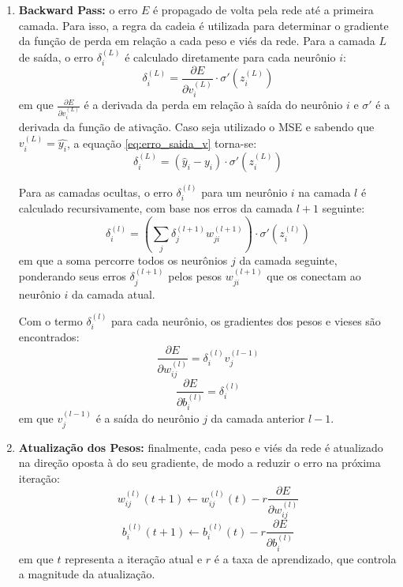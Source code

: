 \begin{enumerate}
\item \textbf{Backward Pass:} o erro $ E $ é propagado de volta pela rede até a primeira camada. Para isso, a regra da cadeia 
é utilizada para determinar o gradiente da função de perda em relação a cada peso e viés da rede. Para a camada $ L $ de saída, 
o erro $ \delta_i^{(L)} $ é calculado diretamente para cada neurônio $ i $:
\begin{equation}
\label{eq:erro_saida_v}
\delta_i^{(L)} = \frac{\partial E}{\partial v_i^{(L)}} \cdot \sigma'(z_i^{(L)})
\end{equation}
em que $\frac{\partial E}{\partial v_i^{(L)}}$ é a derivada da perda em relação à saída do neurônio $i$ e $\sigma'$ é a 
derivada da função de ativação. Caso seja utilizado o MSE e sabendo que $ v_i^{(L)} = \hat{y_i} $, a equação 
\ref{eq:erro_saida_v} torna-se:
\begin{equation}
\label{eq:erro_saida_mse_v}
\delta_i^{(L)} = (\hat{y}_i - y_i) \cdot \sigma'(z_i^{(L)})
\end{equation}

Para as camadas ocultas, o erro $ \delta_i^{(l)} $ para um neurônio $ i $ na camada $ l $ é calculado recursivamente, 
com base nos erros da camada $ l+1 $ seguinte:
\begin{equation}
\label{eq:erro_oculta_v}
\delta_i^{(l)} = \left( \sum_{j} \delta_j^{(l+1)} w_{ji}^{(l+1)} \right) \cdot \sigma'(z_i^{(l)})
\end{equation}
em que a soma percorre todos os neurônios $j$ da camada seguinte, ponderando seus erros $\delta_j^{(l+1)}$ pelos 
pesos $w_{ji}^{(l+1)}$ que os conectam ao neurônio $i$ da camada atual.

Com o termo $\delta_i^{(l)}$ para cada neurônio, os gradientes dos pesos e vieses são encontrados:
\begin{equation}
\label{eq:gradiente_pesos_v}
\frac{\partial E}{\partial w_{ij}^{(l)}} = \delta_i^{(l)} v_j^{(l-1)}
\end{equation}
\begin{equation}
\label{eq:gradiente_bias_v}
\frac{\partial E}{\partial b_i^{(l)}} = \delta_i^{(l)}
\end{equation}
em que $v_j^{(l-1)}$ é a saída do neurônio $j$ da camada anterior $l-1$.

\item \textbf{Atualização dos Pesos:} finalmente, cada peso e viés da rede é atualizado na direção oposta à do seu gradiente, 
de modo a reduzir o erro na próxima iteração:
\begin{equation}
\label{eq:atualizacao_mlp_v}
w_{ij}^{(l)}(t+1) \leftarrow w_{ij}^{(l)}(t) - r \frac{\partial E}{\partial w_{ij}^{(l)}}
\end{equation}
\begin{equation}
\label{eq:atualizacao_bias_v}
b_i^{(l)}(t+1) \leftarrow b_i^{(l)}(t) - r \frac{\partial E}{\partial b_i^{(l)}}
\end{equation}
em que $t$ representa a iteração atual e $r$ é a taxa de aprendizado, que controla a magnitude da atualização.
\end{enumerate}

